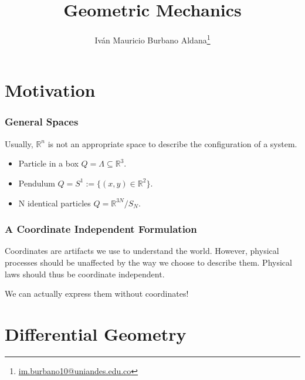 \documentclass{beamer}
\title{Geometric Mechanics}
\author[I. M. Burbano]{Iván Mauricio Burbano Aldana\thanks{\href{mailto:im.burbano10@uniandes.edu.co}{im.burbano10@uniandes.edu.co}}}
\institute[Uniandes]{Universidad de los Andes}
\begin{document}
\frame{\titlepage}

\section{Motivation}

\begin{frame}

\frametitle{General Spaces}

Usually, $\mathbb{R}^n$ is not an appropriate space to describe the configuration of a system.

\begin{itemize}

\item Particle in a box $Q=\Lambda\subseteq\mathbb{R}^3$.

\item Pendulum $Q=S^1:=\{(x,y)\in\mathbb{R}^2\}$.

\item N identical particles $Q=\mathbb{R}^{3N}/S_N$. 

\end{itemize}

\end{frame}

\begin{frame}

\frametitle{A Coordinate Independent Formulation}

Coordinates are artifacts we use to understand the world. However, physical processes should be unaffected by the way we choose to describe them. Physical laws should thus be coordinate independent. 

\vspace{1cm}

We can actually express them without coordinates!

\end{frame}

\section{Differential Geometry}
\end{document}
